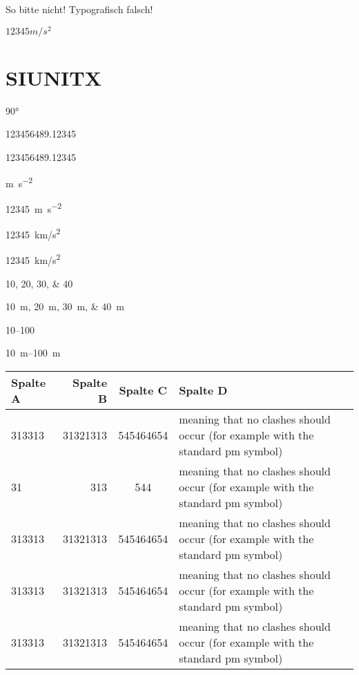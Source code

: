 \documentclass[12pt,ngerman]{scrartcl}
\begin{document}
So bitte nicht! Typografisch falsch!

$12345 m/s^2$

\section{SIUNITX}

\ang{90}

\num{123456489,12345}

\num{123456489.12345}

\unit{\meter\per\square\second}

\qty[per-mode = fraction]{12345}{\meter\per\square\second}

\qty[per-mode = fraction]{12345}{\kilo m/s^2}

\qty[per-mode = fraction]{12345}{km/s^2}

\numlist{10;20;30;40}

\qtylist{10;20;30;40}{\meter}

\numrange{10}{100}

\qtyrange{10}{100}{\meter}


\begin{tabular}{|l|r|c|p{10cm}|} \hline
\textbf{Spalte A } & \textbf{Spalte B} & \textbf{Spalte C} & \textbf{Spalte D} \\ \hline
313313 & 31321313 & 545464654 & meaning that no clashes should occur (for example with the standard pm symbol) \\ \hline
31 & 313 & 544 & meaning that no clashes should occur (for example with the standard pm symbol)  \\ \hline
313313 & 31321313 & 545464654 & meaning that no clashes should occur (for example with the standard pm symbol)  \\ \hline
313313 & 31321313 & 545464654 & meaning that no clashes should occur (for example with the standard pm symbol)  \\ \hline
313313 & 31321313 & 545464654 & meaning that no clashes should occur (for example with the standard pm symbol)  \\ \hline
\end{tabular}

\vspace*{1cm}
\end{document}
